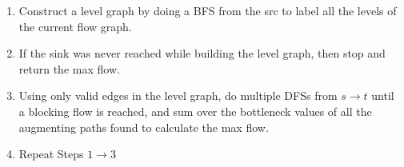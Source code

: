 \begin{enumerate}
    \item Construct a level graph by doing a BFS from the src to label all the levels
        of the current flow graph.
    \item If the sink was never reached while building the level graph, then stop and
        return the max flow.
    \item Using only valid edges in the level graph, do multiple DFSs from $s\to t$ until a
        blocking flow is reached, and sum over the bottleneck values of all the
        augmenting paths found to calculate the max flow.
    \item Repeat Steps $1\to 3$
\end{enumerate}

